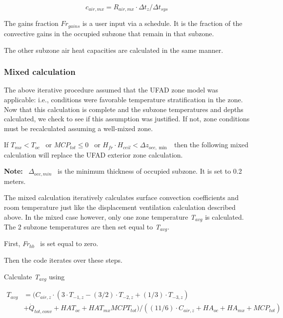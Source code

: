 \begin{equation}
{c_{air,mx}} = {R_{air,mx}} \cdot \Delta {t_z}/\Delta {t_{sys}}
\end{equation}

The gains fraction \(F{r_{gains}}\) is a user input via a schedule. It is the fraction of the convective gains in the occupied subzone that remain in that subzone.

The other subzone air heat capacities are calculated in the same manner.

\subsubsection{Mixed calculation}\label{mixed-calculation-2}

The above iterative procedure assumed that the UFAD zone model was applicable: i.e., conditions were favorable temperature stratification in the zone. Now that this calculation is complete and the subzone temperatures and depths calculated, we check to see if this assumption was justified. If not, zone conditions must be recalculated assuming a well-mixed zone.

If \({T_{mx}} < {T_{oc}}\) ~or \(MC{P_{tot}} \le 0\) ~or \({H_{fr}} \cdot {H_{ceil}} < \Delta {z_{occ,\min }}\) ~then the following mixed calculation will replace the UFAD exterior zone calculation.

\textbf{Note:} ~\({\Delta_{occ,min}}\) ~is the minimum thickness of occupied subzone. It is set to 0.2 meters.

The mixed calculation iteratively calculates surface convection coefficients and room temperature just like the displacement ventilation calculation described above. In the mixed case however, only one zone temperature \emph{T\(_{avg}\)} is calculated. The 2 subzone temperatures are then set equal to \emph{T\(_{avg}\)}.

First, \emph{Fr\(_{hb}\)}~ is set equal to zero.

Then the code iterates over these steps.

Calculate \emph{T\(_{avg}\)} using

\begin{equation}
  \begin{array}{rl}
    T_{avg} &= ({C_{air,z}} \cdot (3 \cdot {T_{ - 1,z}} - (3/2) \cdot {T_{ - 2,z}} + (1/3) \cdot {T_{ - 3,z}}) \\
            &+ {{\dot Q}_{tot,conv}} + HA{T_{oc}} + HA{T_{mx}}MCP{T_{tot}})/((11/6) \cdot {C_{air,z}} + H{A_{oc}} + H{A_{mx}} + MC{P_{tot}})
  \end{array}
\end{equation}

